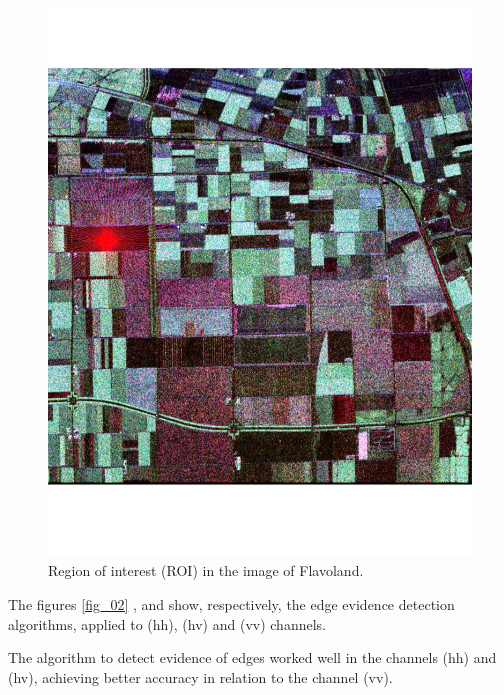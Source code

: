 \documentclass[conference]{IEEEtran}
\begin{document}
\begin{figure}[hbt]
\centering
	\includegraphics[scale=0.3]{flevoland_radial_4_look.pdf}
			\vspace{-1.0cm}
	\caption{Region of interest (ROI) in the image of Flavoland.}
\label{fig_01}
\end{figure}
The figures \ref{fig_02} ,  and  show, respectively, the edge evidence detection algorithms, applied to (hh), (hv) and (vv) channels. 

The algorithm to detect evidence of edges worked well in the channels (hh) and (hv), achieving better accuracy in relation to the channel (vv).  
\end{document}
